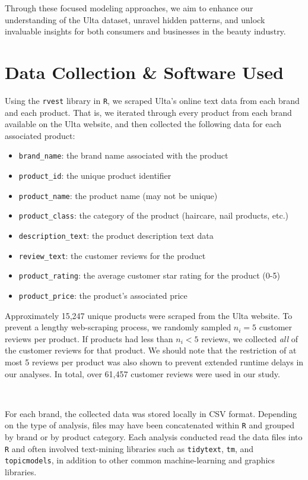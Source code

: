 \documentclass[10pt]{article}
\begin{document}
Through these focused modeling approaches, we aim to enhance our understanding of the Ulta dataset, unravel hidden patterns, and unlock invaluable insights for both consumers and businesses in the beauty industry.

\section{Data Collection \& Software Used}

Using the \texttt{rvest} library in \texttt{R}, we scraped Ulta's online text data from each brand and each product. That is, we iterated through every product from each brand available on the Ulta website, and then collected the following data for each associated product:

\begin{itemize}
    \item \texttt{brand\_name}: the brand name associated with the product
    \item \texttt{product\_id}: the unique product identifier
    \item \texttt{product\_name}: the product name (may not be unique)
    \item \texttt{product\_class}: the category of the product (haircare, nail products, etc.)
    \item \texttt{description\_text}: the product description text data
    \item \texttt{review\_text}: the customer reviews for the product
    \item \texttt{product\_rating}: the average customer star rating for the product (0-5)
    \item \texttt{product\_price}: the product's associated price
\end{itemize}

Approximately 15,247 unique products were scraped from the Ulta website. To prevent a lengthy web-scraping process, we randomly sampled $n_i = 5$ customer reviews per product. If products had less than $n_i < 5$ reviews, we collected \textit{all} of the customer reviews for that product. We should note that the restriction of at most 5 reviews per product was also shown to prevent extended runtime delays in our analyses. In total, over 61,457 customer reviews were used in our study.

\

For each brand, the collected data was stored locally in CSV format. Depending on the type of analysis, files may have been concatenated within \texttt{R} and grouped by brand or by product category. Each analysis conducted read the data files into \texttt{R} and often involved text-mining libraries such as \texttt{tidytext}, \texttt{tm}, and \texttt{topicmodels}, in addition to other common machine-learning and graphics libraries. 
\end{document}

